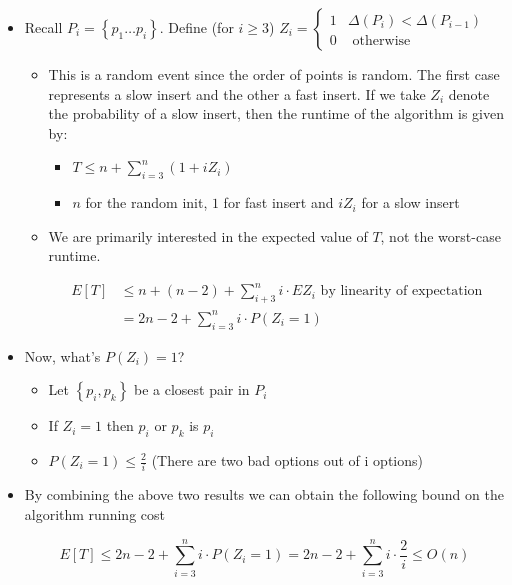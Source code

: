 \documentclass[../notes.tex]{subfiles}
\begin{document}
\begin{itemize}
    \item Recall $ P_i = \left\{ p_1 \ldots p_i \right\}  $. Define (for $ i \ge  3 $) $ Z_i = 
        \begin{cases}
            1 & \Delta(P_i) < \Delta(P_{i-1}) \\
            0 & \text{ otherwise}
        \end{cases} $ 

        \begin{itemize}
            \item This is a random event since the order of points is random. The first case represents a slow insert and the other a fast insert. If we take $ Z_i $ denote the probability of a slow insert, then the runtime of the algorithm is given by:
                \begin{itemize}
                    \item $ T \le n + \sum_{i=3}^{n}(1 + i Z_i) $ 
                    \item $ n $ for the random init, $ 1 $ for fast insert and $ iZ_i $ for a slow insert
                \end{itemize}
            \item We are primarily interested in the expected value of $ T $, not the worst-case runtime.

                \begin{equation}
                    \begin{split}
                        E[T] & \le n + (n-2) + \sum_{i+3}^n i \cdot EZ_i \text{  by linearity of expectation} \\
                         & = 2n-2 + \sum^n_{i=3} i \cdot  P(Z_i = 1) 
                    \end{split}
                \end{equation}
        \end{itemize}
    \item Now, what's $ P(Z_i) = 1 $?
        \begin{itemize}
            \item Let $ \left\{ p_i, p_k \right\} $ be a closest pair in $ P_i $
            \item If $ Z_i  = 1$  then $ p_i $ or $ p_k $ is $ p_i $
            \item $ P(Z_i = 1) \le  \frac{2}{i}  $ (There are two bad options out of i options)
        \end{itemize}
    \item By combining the above two results we can obtain the following bound on the algorithm running cost

        \begin{equation}
            E[T] \le  2n-2 + \sum^n_{i=3} i \cdot  P(Z_i = 1) = 2n-2 + \sum^n_{i=3} i \cdot \frac{2}{i} \le  O(n)
        \end{equation}
\end{itemize}
\end{document}
